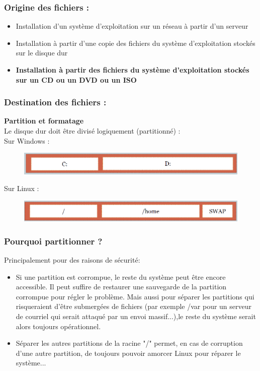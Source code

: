 	\begin{frame}[containsverbatim]
		\frametitle{Origine des fichiers :}
		\begin{itemize}
			\item  Installation d’un système d’exploitation sur un réseau à partir
			d’un serveur
			\item Installation à partir d’une copie des fichiers du système
			d’exploitation stockés sur le disque dur
			\item \textbf{Installation à partir des fichiers du système d’exploitation
			stockés sur un CD ou un DVD ou un ISO}
		\end{itemize}
	\end{frame}
	\begin{frame}[containsverbatim]
		\frametitle{Destination des fichiers :}
		\textbf{Partition et formatage}\\
		Le disque dur doit être divisé logiquement (partitionné) :\\
		\vspace{10pt}
		{\color{blue}Sur Windows : }\\
		\begin{figure}[!h]
			\centering
			\includegraphics[scale=0.4]{images/capture1}
		\end{figure}
		
		{\color{blue}Sur Linux : }\\
		\begin{figure}[!h]
			\centering
			\includegraphics[scale=0.4]{images/capture2}
		\end{figure}
	\end{frame}
	\begin{frame}[containsverbatim]
		\frametitle{Pourquoi partitionner ?}
		Principalement pour des raisons de sécurité:
		\begin{itemize}
			\item  Si une partition est corrompue, le reste du système peut être encore accessible. Il peut suffire de restaurer une sauvegarde de la partition corrompue pour régler le problème. Mais aussi pour séparer les partitions qui risqueraient d'être submergées de fichiers (par exemple /var pour un serveur de courriel qui serait attaqué par un envoi massif...),le reste du système serait alors toujours opérationnel.
			\item Séparer les autres partitions de la racine "/" permet, en cas de corruption d'une autre partition, de toujours pouvoir amorcer Linux pour réparer le système...
			
		\end{itemize}
	\end{frame}
